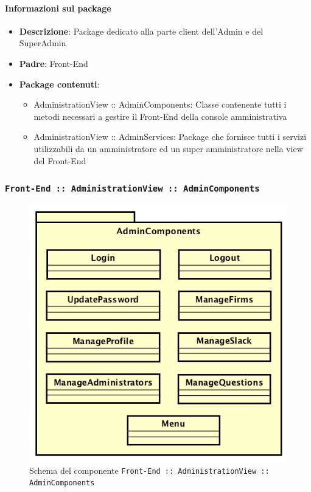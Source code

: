 \documentclass[../DefinizioneDiProdotto.tex]{subfiles}
\begin{document}
		\paragraph{Informazioni sul package}\begin{itemize}
		\item \textbf{Descrizione}: Package dedicato alla parte client dell'Admin e del SuperAdmin
		\item \textbf{Padre}: Front-End
		\item \textbf{Package contenuti}:
	\begin{itemize}\item AdministrationView :: AdminComponents: Classe contenente tutti i metodi necessari a gestire il Front-End della console amministrativa
	\item AdministrationView :: AdminServices: Package che fornisce tutti i servizi utilizzabili da un amministratore ed un super amministratore nella view del Front-End
	\end{itemize}\end{itemize}
	\subsubsection{ \texttt{Front-End :: AdministrationView :: AdminComponents}}
		\begin{figure}[!h]
			\centering
			\includegraphics[scale=0.7]{Architettura/Front-End/Administration/AdminComponents.png}
			\caption{Schema del componente \texttt{Front-End :: AdministrationView :: AdminComponents}}
		\end{figure}
\end{document}
